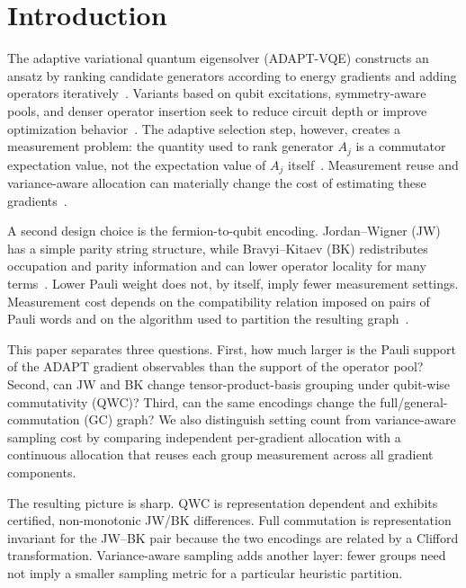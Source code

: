 \documentclass[aps,pra,twocolumn,superscriptaddress,nofootinbib,floatfix]{revtex4-2}
\begin{document}
\maketitle

\section{Introduction}

The adaptive variational quantum eigensolver (ADAPT-VQE) constructs an ansatz by ranking candidate generators according to energy gradients and adding operators iteratively~\cite{grimsley2019adaptive}. Variants based on qubit excitations, symmetry-aware pools, and denser operator insertion seek to reduce circuit depth or improve optimization behavior~\cite{tang2021qubitadapt,shkolnikov2023symmetry,anastasiou2024tetris}. The adaptive selection step, however, creates a measurement problem: the quantity used to rank generator $A_j$ is a commutator expectation value, not the expectation value of $A_j$ itself~\cite{anastasiou2023gradients}. Measurement reuse and variance-aware allocation can materially change the cost of estimating these gradients~\cite{nykanen2025aimadapt,ikhtiarudin2026shot}.

A second design choice is the fermion-to-qubit encoding. Jordan--Wigner (JW) has a simple parity string structure, while Bravyi--Kitaev (BK) redistributes occupation and parity information and can lower operator locality for many terms~\cite{bravyi2002fermionic,seeley2012bravyi,tranter2015bkproperties,tranter2018comparison}. Lower Pauli weight does not, by itself, imply fewer measurement settings. Measurement cost depends on the compatibility relation imposed on pairs of Pauli words and on the algorithm used to partition the resulting graph~\cite{izmaylov2019revising,verteletskyi2020mcc,yen2020measuring,crawford2021sortedinsertion}.

This paper separates three questions. First, how much larger is the Pauli support of the ADAPT gradient observables than the support of the operator pool? Second, can JW and BK change tensor-product-basis grouping under qubit-wise commutativity (QWC)? Third, can the same encodings change the full/general-commutation (GC) graph? We also distinguish setting count from variance-aware sampling cost by comparing independent per-gradient allocation with a continuous allocation that reuses each group measurement across all gradient components.

The resulting picture is sharp. QWC is representation dependent and exhibits certified, non-monotonic JW/BK differences. Full commutation is representation invariant for the JW--BK pair because the two encodings are related by a Clifford transformation. Variance-aware sampling adds another layer: fewer groups need not imply a smaller sampling metric for a particular heuristic partition.
\end{document}
